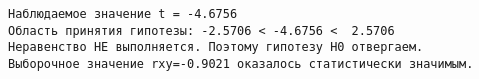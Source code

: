 \documentclass[11pt]{article}
\begin{document}
    \begin{Verbatim}[commandchars=\\\{\}]
Наблюдаемое значение t = -4.6756
Область принятия гипотезы: -2.5706 < -4.6756 <  2.5706
Неравенство НЕ выполняется. Поэтому гипотезу H0 отвергаем.
Выборочное значение rxy=-0.9021 оказалось статистически значимым.
    \end{Verbatim}


    
    
    
\end{document}
